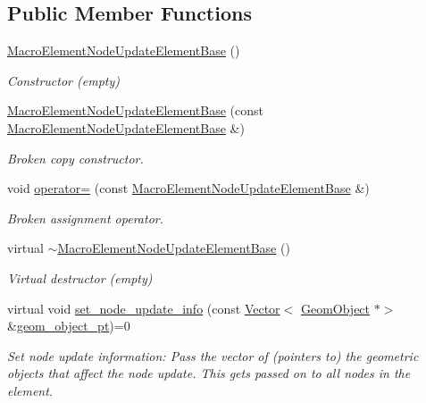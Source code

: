 \subsection*{Public Member Functions}
\begin{DoxyCompactItemize}
\item 
\hyperlink{classoomph_1_1MacroElementNodeUpdateElementBase_a5d9b3d1502a5c082e345fb3dcee1eaa2}{Macro\+Element\+Node\+Update\+Element\+Base} ()
\begin{DoxyCompactList}\small\item\em Constructor (empty) \end{DoxyCompactList}\item 
\hyperlink{classoomph_1_1MacroElementNodeUpdateElementBase_ad10f3bede01aefd41a37016fb2ffc20d}{Macro\+Element\+Node\+Update\+Element\+Base} (const \hyperlink{classoomph_1_1MacroElementNodeUpdateElementBase}{Macro\+Element\+Node\+Update\+Element\+Base} \&)
\begin{DoxyCompactList}\small\item\em Broken copy constructor. \end{DoxyCompactList}\item 
void \hyperlink{classoomph_1_1MacroElementNodeUpdateElementBase_a0ed75919d7e8f45f58edead7746dd436}{operator=} (const \hyperlink{classoomph_1_1MacroElementNodeUpdateElementBase}{Macro\+Element\+Node\+Update\+Element\+Base} \&)
\begin{DoxyCompactList}\small\item\em Broken assignment operator. \end{DoxyCompactList}\item 
virtual \hyperlink{classoomph_1_1MacroElementNodeUpdateElementBase_a2d32df96459ec2729db7a33e3504a4e2}{$\sim$\+Macro\+Element\+Node\+Update\+Element\+Base} ()
\begin{DoxyCompactList}\small\item\em Virtual destructor (empty) \end{DoxyCompactList}\item 
virtual void \hyperlink{classoomph_1_1MacroElementNodeUpdateElementBase_a21fd47abb3a0fff0920e4b70b9186199}{set\+\_\+node\+\_\+update\+\_\+info} (const \hyperlink{classoomph_1_1Vector}{Vector}$<$ \hyperlink{classoomph_1_1GeomObject}{Geom\+Object} $\ast$$>$ \&\hyperlink{classoomph_1_1MacroElementNodeUpdateElementBase_a45d0d15ee371799c84f59bb13cdac304}{geom\+\_\+object\+\_\+pt})=0
\begin{DoxyCompactList}\small\item\em Set node update information\+: Pass the vector of (pointers to) the geometric objects that affect the node update. This gets passed on to all nodes in the element. \end{DoxyCompactList}\item 
$$
\end{DoxyCompactItemize}

